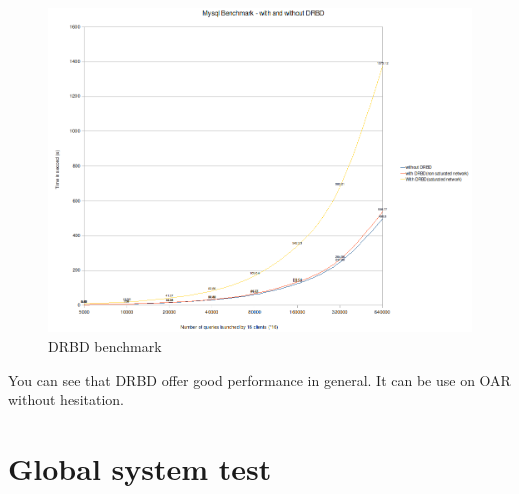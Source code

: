\documentclass[a4paper,10pt]{report}
\begin{document}
\begin{figure}[H]
\begin{center}
\includegraphics[scale=0.5]{schema/drbd-test.png}
\end{center}
\caption{DRBD benchmark} 
\label{hb-gui-2nodes} 
\end{figure}

You can see that DRBD offer good performance in general. It can be use on OAR without hesitation.



\section{Global system test}
\end{document}
